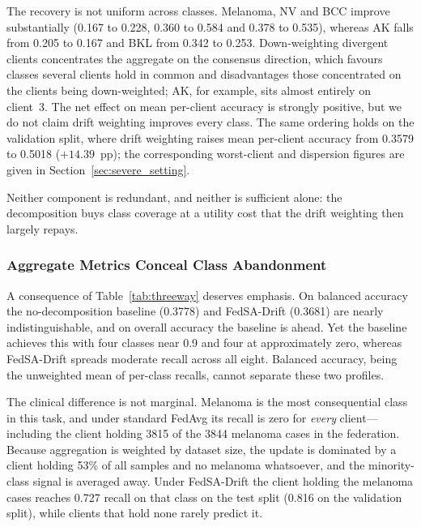 \documentclass[utf8]{FrontiersinHarvard} %
\newcommand{\sadrift}{FedSA-Drift}
\begin{document}
The recovery is not uniform across classes. Melanoma, NV and BCC improve substantially (0.167 to 0.228, 0.360 to 0.584 and 0.378 to 0.535), whereas AK falls from 0.205 to 0.167 and BKL from 0.342 to 0.253. Down-weighting divergent clients concentrates the aggregate on the consensus direction, which favours classes several clients hold in common and disadvantages those concentrated on the clients being down-weighted; AK, for example, sits almost entirely on client~3. The net effect on mean per-client accuracy is strongly positive, but we do not claim drift weighting improves every class. The same ordering holds on the validation split, where drift weighting raises mean per-client accuracy from 0.3579 to 0.5018 ($+14.39$~pp); the corresponding worst-client and dispersion figures are given in Section~\ref{sec:severe_setting}.

Neither component is redundant, and neither is sufficient alone: the decomposition buys class coverage at a utility cost that the drift weighting then largely repays.

\subsubsection{Aggregate Metrics Conceal Class Abandonment}

A consequence of Table~\ref{tab:threeway} deserves emphasis. On balanced accuracy the no-decomposition baseline (0.3778) and \sadrift{} (0.3681) are nearly indistinguishable, and on overall accuracy the baseline is ahead. Yet the baseline achieves this with four classes near 0.9 and four at approximately zero, whereas \sadrift{} spreads moderate recall across all eight. Balanced accuracy, being the unweighted mean of per-class recalls, cannot separate these two profiles.

The clinical difference is not marginal. Melanoma is the most consequential class in this task, and under standard FedAvg its recall is zero for \emph{every} client---including the client holding 3815 of the 3844 melanoma cases in the federation. Because aggregation is weighted by dataset size, the update is dominated by a client holding 53\% of all samples and no melanoma whatsoever, and the minority-class signal is averaged away. Under \sadrift{} the client holding the melanoma cases reaches 0.727 recall on that class on the test split (0.816 on the validation split), while clients that hold none rarely predict it.
\end{document}
